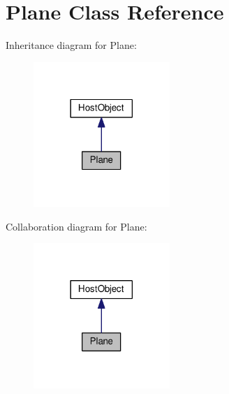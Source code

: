 \hypertarget{class_plane}{}\section{Plane Class Reference}
\label{class_plane}


Inheritance diagram for Plane\+:
\nopagebreak
\begin{figure}[H]
\begin{center}
\leavevmode
\includegraphics[width=146pt]{class_plane__inherit__graph}
\end{center}
\end{figure}


Collaboration diagram for Plane\+:
\nopagebreak
\begin{figure}[H]
\begin{center}
\leavevmode
\includegraphics[width=146pt]{class_plane__coll__graph}
\end{center}
\end{figure}
